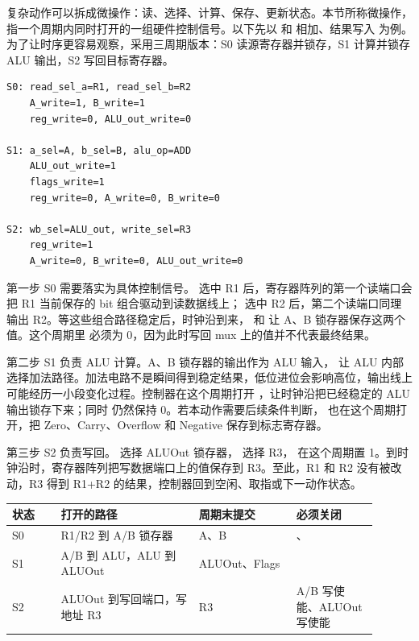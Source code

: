 
复杂动作可以拆成微操作：读、选择、计算、保存、更新状态。本节所称微操作，指一个周期内同时打开的一组硬件控制信号。以下先以  和  相加、结果写入  为例。为了让时序更容易观察，采用三周期版本：S0 读源寄存器并锁存，S1 计算并锁存 ALU 输出，S2 写回目标寄存器。

\begin{lstlisting}
S0: read_sel_a=R1, read_sel_b=R2
    A_write=1, B_write=1
    reg_write=0, ALU_out_write=0

S1: a_sel=A, b_sel=B, alu_op=ADD
    ALU_out_write=1
    flags_write=1
    reg_write=0, A_write=0, B_write=0

S2: wb_sel=ALU_out, write_sel=R3
    reg_write=1
    A_write=0, B_write=0, ALU_out_write=0
\end{lstlisting}

第一步 S0 需要落实为具体控制信号。  选中 R1 后，寄存器阵列的第一个读端口会把 R1 当前保存的 bit 组合驱动到读数据线上；  选中 R2 后，第二个读端口同理输出 R2。等这些组合路径稳定后，时钟沿到来， 和  让 A、B 锁存器保存这两个值。这个周期里  必须为 0，因为此时写回 mux 上的值并不代表最终结果。

第二步 S1 负责 ALU 计算。A、B 锁存器的输出作为 ALU 输入， 让 ALU 内部选择加法路径。加法电路不是瞬间得到稳定结果，低位进位会影响高位，输出线上可能经历一小段变化过程。控制器在这个周期打开 ，让时钟沿把已经稳定的 ALU 输出锁存下来；同时  仍然保持 0。若本动作需要后续条件判断， 也在这个周期打开，把 Zero、Carry、Overflow 和 Negative 保存到标志寄存器。

第三步 S2 负责写回。  选择 ALUOut 锁存器， 选择 R3， 在这个周期置 1。到时钟沿时，寄存器阵列把写数据端口上的值保存到 R3。至此，R1 和 R2 没有被改动，R3 得到 R1+R2 的结果，控制器回到空闲、取指或下一动作状态。

\begin{longtable}{L{0.12\linewidth}L{0.34\linewidth}L{0.24\linewidth}L{0.2\linewidth}}
\toprule
状态 & 打开的路径 & 周期末提交 & 必须关闭 \\
\midrule
S0 & R1/R2 到 A/B 锁存器 & A、B & 、 \\
S1 & A/B 到 ALU，ALU 到 ALUOut & ALUOut、Flags &  \\
S2 & ALUOut 到写回端口，写地址 R3 & R3 & A/B 写使能、ALUOut 写使能 \\
\bottomrule
\end{longtable}

